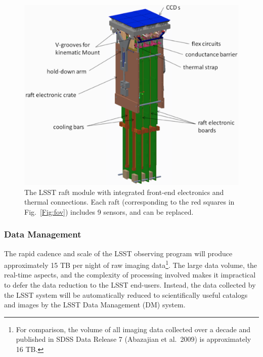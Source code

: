 \documentclass{emulateapj}
\begin{document}
\begin{figure}[ht]
\includegraphics[width=1.\hsize,clip]{raft-updated-cropped.pdf}
\caption{The LSST raft module with integrated front-end electronics
and thermal connections. Each raft (corresponding to the red squares
in Fig.~\ref{Fig:fov}) 
includes 9 sensors, and can be replaced.} 
\label{Fig:raft}
\end{figure}



\vskip 0.2in
\subsubsection{ Data Management }
\label{sec:dm}

The rapid cadence and scale of the LSST observing program will produce
approximately 15 TB per night of raw imaging data\footnote{For
  comparison, the volume of all imaging data collected over a decade
  and published in SDSS Data Release 7 (Abazajian et al.~2009) is approximately 16 TB.}. The large data volume, the real-time aspects, and the complexity of processing involved makes it impractical to defer the data reduction to the LSST end-users. Instead, the data collected by the LSST system will be automatically reduced to scientifically useful catalogs and images by the LSST Data Management (DM) system.
\\
\end{document}
